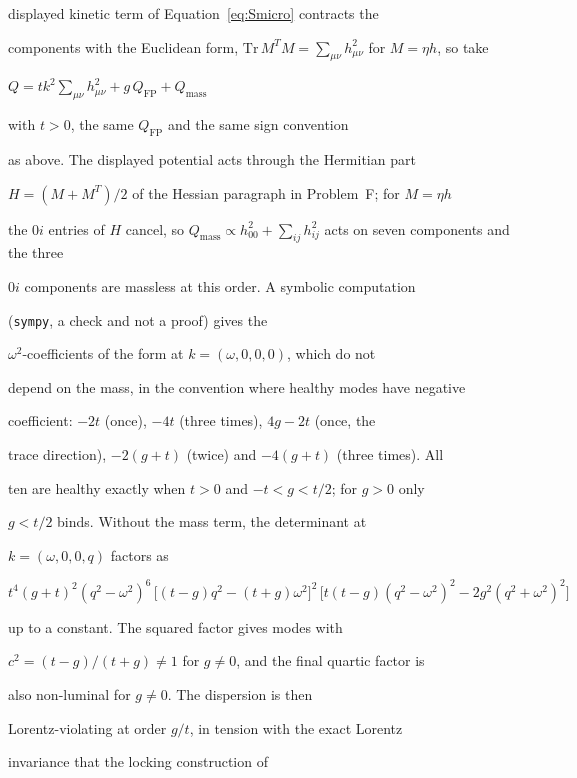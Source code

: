 displayed kinetic term of Equation~\eqref{eq:Smicro} contracts the

components with the Euclidean form, \(\mathrm{Tr}\,M^{T}M=\sum_{\mu\nu}

h_{\mu\nu}^2\) for \(M=\eta h\), so take

\(Q=tk^2\sum_{\mu\nu}h_{\mu\nu}^2+g\,Q_{\mathrm{FP}}+Q_{\mathrm{mass}}\)

with \(t>0\), the same \(Q_{\mathrm{FP}}\) and the same sign convention

as above.  The displayed potential acts through the Hermitian part

\(H=(M+M^{T})/2\) of the Hessian paragraph in Problem~F; for \(M=\eta h\)

the \(0i\) entries of \(H\) cancel, so \(Q_{\mathrm{mass}}\propto

h_{00}^2+\sum_{ij}h_{ij}^2\) acts on seven components and the three

\(0i\) components are massless at this order.  A symbolic computation

(\texttt{sympy}, a check and not a proof) gives the

\(\omega^2\)-coefficients of the form at \(k=(\omega,0,0,0)\), which do not

depend on the mass, in the convention where healthy modes have negative

coefficient: \(-2t\) (once), \(-4t\) (three times), \(4g-2t\) (once, the

trace direction), \(-2(g+t)\) (twice) and \(-4(g+t)\) (three times).  All

ten are healthy exactly when \(t>0\) and \(-t<g<t/2\); for \(g>0\) only

\(g<t/2\) binds.  Without the mass term, the determinant at

\(k=(\omega,0,0,q)\) factors as

\(t^4(g+t)^2(q^2-\omega^2)^6\,

\bigl[(t-g)q^2-(t+g)\omega^2\bigr]^2\,

\bigl[t(t-g)(q^2-\omega^2)^2-2g^2(q^2+\omega^2)^2\bigr]\)

up to a constant.  The squared factor gives modes with

\(c^2=(t-g)/(t+g)\neq1\) for \(g\neq0\), and the final quartic factor is

also non-luminal for \(g\neq0\).  The dispersion is then

Lorentz-violating at order \(g/t\), in tension with the exact Lorentz

invariance that the locking construction of

